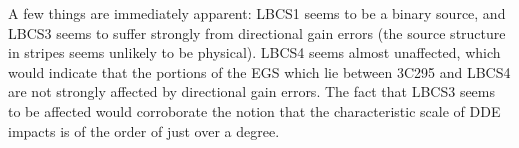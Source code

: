 %

\pg
A few things are immediately apparent: LBCS1 seems to be a binary source, and LBCS3 seems to suffer strongly from directional gain errors (the source structure in stripes seems unlikely to be physical). LBCS4 seems almost unaffected, which would indicate that the portions of the EGS which lie between 3C295 and LBCS4 are not strongly affected by directional gain errors. The fact that LBCS3 seems to be affected would corroborate the notion that the characteristic scale of DDE impacts is of the order of just over a degree.%


